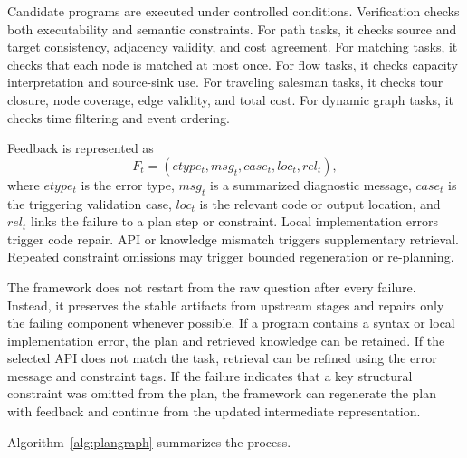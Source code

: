\documentclass[pdflatex,sn-mathphys-num]{sn-jnl}
\theoremstyle{thmstyleone}
\theoremstyle{thmstyletwo}
\theoremstyle{thmstylethree}
\begin{document}
Candidate programs are executed under controlled conditions. Verification checks both executability and semantic constraints. For path tasks, it checks source and target consistency, adjacency validity, and cost agreement. For matching tasks, it checks that each node is matched at most once. For flow tasks, it checks capacity interpretation and source-sink use. For traveling salesman tasks, it checks tour closure, node coverage, edge validity, and total cost. For dynamic graph tasks, it checks time filtering and event ordering.

Feedback is represented as
\begin{equation}
F_t=(etype_t,msg_t,case_t,loc_t,rel_t),
\end{equation}
where $etype_t$ is the error type, $msg_t$ is a summarized diagnostic message, $case_t$ is the triggering validation case, $loc_t$ is the relevant code or output location, and $rel_t$ links the failure to a plan step or constraint. Local implementation errors trigger code repair. API or knowledge mismatch triggers supplementary retrieval. Repeated constraint omissions may trigger bounded regeneration or re-planning.

The framework does not restart from the raw question after every failure. Instead, it preserves the stable artifacts from upstream stages and repairs only the failing component whenever possible. If a program contains a syntax or local implementation error, the plan and retrieved knowledge can be retained. If the selected API does not match the task, retrieval can be refined using the error message and constraint tags. If the failure indicates that a key structural constraint was omitted from the plan, the framework can regenerate the plan with feedback and continue from the updated intermediate representation.

Algorithm~\ref{alg:plangraph} summarizes the process.
\end{document}
